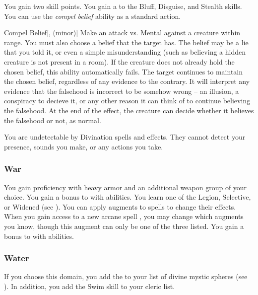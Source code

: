              You gain two skill points.
             You gain a   to the Bluff, Disguise, and Stealth skills.
             You can use the \textit{compel belief} ability as a standard action.
            \begin{freeability}{Compel Belief}[,  (minor)]
                Make an attack vs. Mental against a creature within \rngmed range.
                You must also choose a belief that the target has.
                The belief may be a lie that you told it, or even a simple misunderstanding (such as believing a hidden creature is not present in a room).
                If the creature does not already hold the chosen belief, this ability automatically fails.
                \hit The target continues to maintain the chosen belief, regardless of any evidence to the contrary.
                It will interpret any evidence that the falsehood is incorrect to be somehow wrong -- an illusion, a conspiracy to decieve it, or any other reason it can think of to continue believing the falsehood.
                At the end of the effect, the creature can decide whether it believes the falsehood or not, as normal.
            \end{freeability}
             You are undetectable by Divination spells and effects.
            They cannot detect your presence, sounds you make, or any actions you take.

        \subsubsection{War}
             You gain proficiency with heavy armor and an additional weapon group of your choice.
             You gain a  bonus to  with  abilities.
             You learn one of the Legion, Selective, or Widened  (see ).
            You can apply augments to spells to change their effects.
            When you gain access to a new arcane spell , you may change which augments you know, though this augment can only be one of the three listed.
             You gain a  bonus to  with  abilities.

        \subsubsection{Water}
            If you choose this domain, you add the   to your list of divine mystic spheres (see ).
            In addition, you add the Swim skill to your cleric  list.

